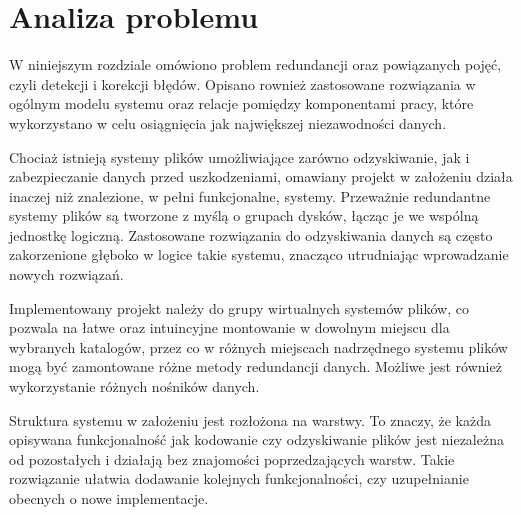 \chapter{Analiza problemu}
\thispagestyle{chapterBeginStyle}
\label{rozdzial1}
W niniejszym rozdziale omówiono problem redundancji oraz powiązanych pojęć, czyli detekcji i korekcji błędów. Opisano rownież zastosowane rozwiązania w ogólnym modelu systemu oraz relacje pomiędzy komponentami pracy, które wykorzystano w celu osiągnięcia jak największej niezawodności danych.

Chociaż istnieją systemy plików umożliwiające zarówno odzyskiwanie, jak i zabezpieczanie danych przed uszkodzeniami\cite{Java}, omawiany projekt w założeniu działa inaczej niż znalezione, w pełni funkcjonalne, systemy. Przeważnie redundantne systemy plików są tworzone z myślą o grupach dysków, łącząc je we wspólną jednostkę logiczną. Zastosowane rozwiązania do odzyskiwania danych są często zakorzenione głęboko w logice takie systemu, znacząco utrudniając wprowadzanie nowych rozwiązań.

Implementowany projekt należy do grupy wirtualnych systemów plików, co pozwala na łatwe oraz intuincyjne montowanie w dowolnym miejscu dla wybranych katalogów, przez co w różnych miejscach nadrzędnego systemu plików mogą być zamontowane różne metody redundancji danych. Możliwe jest również wykorzystanie różnych nośników danych. 

Struktura systemu w założeniu jest rozłożona na warstwy. To znaczy, że każda opisywana funkcjonalność jak kodowanie czy odzyskiwanie plików jest niezależna od pozostałych i działają bez znajomości poprzedzających warstw. Takie rozwiązanie ułatwia dodawanie kolejnych funkcjonalności, czy uzupełnianie obecnych o nowe implementacje.

